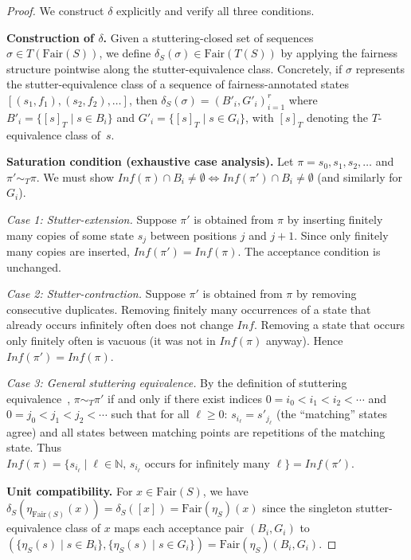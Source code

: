 \documentclass[11pt]{article}
\newcommand{\Fair}{\ensuremath{\mathrm{Fair}}}
\newcommand{\naturals}{\mathbb{N}}
\begin{document}
\begin{proof}
We construct $\delta$ explicitly and verify all three conditions.

\textbf{Construction of $\delta$.}
Given a stuttering-closed set of sequences $\sigma \in T(\Fair(S))$,
we define $\delta_S(\sigma) \in \Fair(T(S))$ by applying the fairness
structure pointwise along the stutter-equivalence class.
Concretely, if $\sigma$ represents the stutter-equivalence class of
a sequence of fairness-annotated states
$[(s_1, f_1), (s_2, f_2), \ldots]$,
then $\delta_S(\sigma) = (B'_i, G'_i)_{i=1}^r$ where
$B'_i = \{[s]_T \mid s \in B_i\}$ and
$G'_i = \{[s]_T \mid s \in G_i\}$,
with $[s]_T$ denoting the $T$-equivalence class of~$s$.

\textbf{Saturation condition (exhaustive case analysis).}
Let $\pi = s_0, s_1, s_2, \ldots$ and $\pi' \sim_T \pi$.
We must show $\mathit{Inf}(\pi) \cap B_i \neq \emptyset \Leftrightarrow
\mathit{Inf}(\pi') \cap B_i \neq \emptyset$ (and similarly for $G_i$).

\emph{Case 1: Stutter-extension.}
Suppose $\pi'$ is obtained from $\pi$ by inserting finitely many copies
of some state $s_j$ between positions $j$ and $j+1$.
Since only finitely many copies are inserted, $\mathit{Inf}(\pi') = \mathit{Inf}(\pi)$.
The acceptance condition is unchanged.

\emph{Case 2: Stutter-contraction.}
Suppose $\pi'$ is obtained from $\pi$ by removing consecutive duplicates.
Removing finitely many occurrences of a state that already occurs infinitely
often does not change $\mathit{Inf}$.
Removing a state that occurs only finitely often is vacuous (it was not
in $\mathit{Inf}(\pi)$ anyway).
Hence $\mathit{Inf}(\pi') = \mathit{Inf}(\pi)$.

\emph{Case 3: General stuttering equivalence.}
By the definition of stuttering equivalence~\cite{BeoharK17,Lamport94},
$\pi \sim_T \pi'$ if and only if there exist indices
$0 = i_0 < i_1 < i_2 < \cdots$ and $0 = j_0 < j_1 < j_2 < \cdots$
such that for all $\ell \geq 0$:
$s_{i_\ell} = s'_{j_\ell}$ (the ``matching'' states agree) and
all states between matching points are repetitions of the matching state.
Thus $\mathit{Inf}(\pi) = \{s_{i_\ell} \mid \ell \in \naturals,\,
s_{i_\ell} \text{ occurs for infinitely many } \ell\}
= \mathit{Inf}(\pi')$.

\textbf{Unit compatibility.}
For $x \in \Fair(S)$, we have
$\delta_S(\eta_{\Fair(S)}(x)) = \delta_S([x]) = \Fair(\eta_S)(x)$
since the singleton stutter-equivalence class of $x$ maps each acceptance
pair $(B_i, G_i)$ to $(\{\eta_S(s) \mid s \in B_i\}, \{\eta_S(s) \mid
s \in G_i\}) = \Fair(\eta_S)(B_i, G_i)$.


\end{proof}
\end{document}
